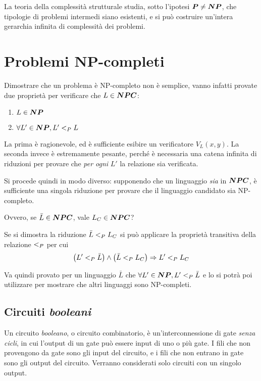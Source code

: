 La teoria della complessità strutturale studia, sotto l'ipotesi $\bm{P} \ne \bm{NP}$, che tipologie di problemi intermedi siano esistenti, e si può costruire un'intera gerarchia infinita di complessità dei problemi.

\section{Problemi NP-completi}

Dimostrare che un problema è NP-completo non è semplice, vanno infatti provate due proprietà per verificare che $L \in \bm{NPC}$:
\begin{enumerate}
    \item $L \in \bm{NP}$
    \item $\forall L' \in \bm{NP}, L' <_P L$
\end{enumerate}
La prima è ragionevole, ed è sufficiente esibire un verificatore $V_L(x,y)$. La seconda invece è estremamente pesante, perché è necessaria una catena infinita di riduzioni per provare che \emph{per ogni} $L'$ la relazione sia verificata.

Si procede quindi in modo diverso: supponendo che un linguaggio \emph{sia} in $\bm{NPC}$, è sufficiente una singola riduzione per provare che il linguaggio candidato sia NP-completo.

Ovvero, se $\bar{L} \in \bm{NPC}$, vale $L_C \in \bm{NPC}$?

Se si dimostra la riduzione
$
\bar{L} <_P L_C
$
si può applicare la proprietà transitiva della relazione $<_P$ per cui
\begin{equation*}
    \left( L' <_P \bar{L} \right) \wedge \left( \bar{L} <_P L_C \right) \Rightarrow  L' <_P L_C
\end{equation*}

Va quindi provato per un linguaggio $\bar{L}$ che
$\forall L' \in \bm{NP}, L' <_P \bar{L}$
e lo si potrà poi utilizzare per mostrare che altri linguaggi sono NP-completi.

\subsection{Circuiti \emph{booleani}}

Un circuito \emph{booleano}, o circuito combinatorio, è un'interconnessione di gate \emph{senza cicli}, in cui l'output di un gate può essere input di uno o più gate. I fili che non provengono da gate sono gli input del circuito, e i fili che non entrano in gate sono gli output del circuito. Verranno considerati solo circuiti con un singolo output.

